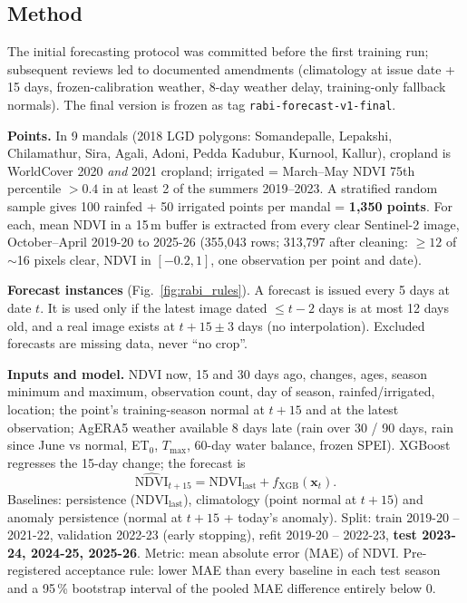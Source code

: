 \documentclass[11pt,a4paper,oneside]{article}
\begin{document}
\subsection{Method}
The initial forecasting protocol was committed before the first training run; subsequent reviews led to documented amendments (climatology at issue date + 15 days, frozen-calibration weather, 8-day weather delay, training-only fallback normals). The final version is frozen as tag \texttt{rabi-forecast-v1-final}.

\textbf{Points.} In 9 mandals (2018 LGD polygons: Somandepalle, Lepakshi, Chilamathur, Sira, Agali, Adoni, Pedda Kadubur, Kurnool, Kallur), cropland is WorldCover 2020 \emph{and} 2021 cropland; irrigated = March--May NDVI 75th percentile $> 0.4$ in at least 2 of the summers 2019--2023. A stratified random sample gives 100 rainfed + 50 irrigated points per mandal = \textbf{1,350 points}. For each, mean NDVI in a 15\,m buffer is extracted from every clear Sentinel-2 image, October--April 2019-20 to 2025-26 (355,043 rows; 313,797 after cleaning: $\ge 12$ of $\sim$16 pixels clear, NDVI in $[-0.2, 1]$, one observation per point and date).

\textbf{Forecast instances} (Fig.~\ref{fig:rabi_rules}). A forecast is issued every 5 days at date $t$. It is used only if the latest image dated $\le t-2$ days is at most 12 days old, and a real image exists at $t+15 \pm 3$ days (no interpolation). Excluded forecasts are missing data, never ``no crop''.

\textbf{Inputs and model.} NDVI now, 15 and 30 days ago, changes, ages, season minimum and maximum, observation count, day of season, rainfed/irrigated, location; the point's training-season normal at $t+15$ and at the latest observation; AgERA5 weather available 8 days late (rain over 30 / 90 days, rain since June vs normal, ET$_0$, $T_{\max}$, 60-day water balance, frozen SPEI). XGBoost regresses the 15-day change; the forecast is
\begin{equation}
\widehat{\mathrm{NDVI}}_{t+15} = \mathrm{NDVI}_{\text{last}} + f_{\text{XGB}}(\mathbf{x}_t).
\end{equation}
Baselines: persistence ($\mathrm{NDVI}_{\text{last}}$), climatology (point normal at $t+15$) and anomaly persistence (normal at $t+15$ + today's anomaly). Split: train 2019-20 -- 2021-22, validation 2022-23 (early stopping), refit 2019-20 -- 2022-23, \textbf{test 2023-24, 2024-25, 2025-26}. Metric: mean absolute error (MAE) of NDVI. Pre-registered acceptance rule: lower MAE than every baseline in each test season and a 95\,\% bootstrap interval of the pooled MAE difference entirely below 0.
\end{document}
